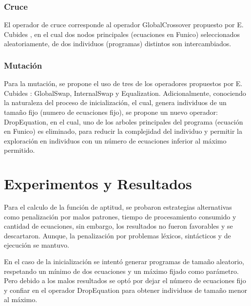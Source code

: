 \documentclass{llncs}
\begin{document}
\subsubsection{Cruce}
El operador de cruce corresponde al operador GlobalCrossover propuesto por E. Cubides \cite{cub:gom:2}, en el cual dos  nodos principales (ecuaciones en Funico) seleccionados aleatoriamente, de dos individuos (programas) distintos son intercambiados.
\subsubsection{Mutación}
Para la mutación, se propone el uso de tres de los operadores propuestos por E. Cubides \cite{cub:gom:2}: GlobalSwap, InternalSwap y Equalization. Adicionalmente, conociendo la naturaleza del proceso de inicialización, el cual, genera individuos de un tamaño fijo (numero de ecuaciones fijo), se propone un nuevo operador: DropEquation, en el cual, uno de los arboles principales del programa (ecuación en Funico) es eliminado, para reducir la complejidad del individuo y permitir la exploración en individuos con un número de ecuaciones inferior al máximo permitido.

\section{Experimentos y Resultados}
Para el calculo de la función de aptitud, se probaron estrategias alternativas como penalización por malos patrones, tiempo de procesamiento consumido y cantidad de ecuaciones, sin embargo, los resultados no fueron favorables y se descartaron. Aunque, la penalización por problemas léxicos, sintácticos y de ejecución se mantuvo.

En el caso de la inicialización se intentó generar programas de tamaño aleatorio, respetando un mínimo de dos ecuaciones y un máximo fijado como parámetro. Pero debido a los malos resultados se optó por dejar el número de ecuaciones fijo y confiar en el operador DropEquation para obtener individuos de tamaño menor al máximo.
\end{document}
